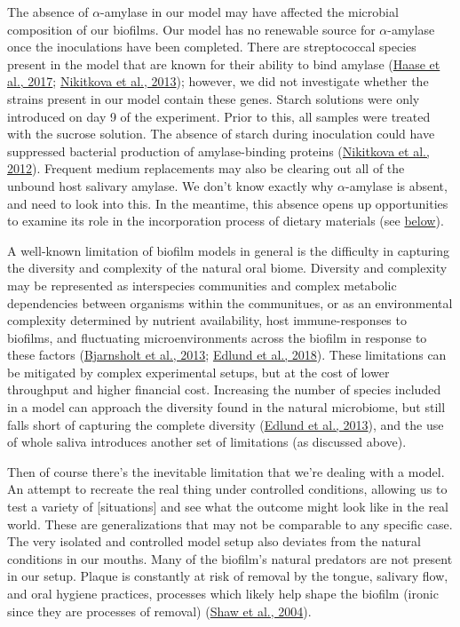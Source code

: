 \documentclass[
  letterpaper,
]{book}
\begin{document}
The absence of \(\alpha\)-amylase in our model may have affected the
microbial composition of our biofilms. Our model has no renewable source
for \(\alpha\)-amylase once the inoculations have been completed. There
are streptococcal species present in the model that are known for their
ability to bind amylase
(\protect\hyperlink{ref-haaseComparativeGenomics2017}{Haase et al.,
2017}; \protect\hyperlink{ref-nikitkovaStarchBiofilms2013}{Nikitkova et
al., 2013}); however, we did not investigate whether the strains present
in our model contain these genes. Starch solutions were only introduced
on day 9 of the experiment. Prior to this, all samples were treated with
the sucrose solution. The absence of starch during inoculation could
have suppressed bacterial production of amylase-binding proteins
(\protect\hyperlink{ref-nikitkovaEffectStarch2012}{Nikitkova et al.,
2012}). Frequent medium replacements may also be clearing out all of the
unbound host salivary amylase. We don't know exactly why
\(\alpha\)-amylase is absent, and need to look into this. In the
meantime, this absence opens up opportunities to examine its role in the
incorporation process of dietary materials (see
\protect\hyperlink{bfmodels-in-arch}{below}).

A well-known limitation of biofilm models in general is the difficulty
in capturing the diversity and complexity of the natural oral biome.
Diversity and complexity may be represented as interspecies communities
and complex metabolic dependencies between organisms within the
communitues, or as an environmental complexity determined by nutrient
availability, host immune-responses to biofilms, and fluctuating
microenvironments across the biofilm in response to these factors
(\protect\hyperlink{ref-bjarnsholtVivoBiofilm2013}{Bjarnsholt et al.,
2013}; \protect\hyperlink{ref-edlundUncoveringComplex2018}{Edlund et
al., 2018}). These limitations can be mitigated by complex experimental
setups, but at the cost of lower throughput and higher financial cost.
Increasing the number of species included in a model can approach the
diversity found in the natural microbiome, but still falls short of
capturing the complete diversity
(\protect\hyperlink{ref-edlundBiofilmModel2013}{Edlund et al., 2013}),
and the use of whole saliva introduces another set of limitations (as
discussed above).

Then of course there's the inevitable limitation that we're dealing with
a model. An attempt to recreate the real thing under controlled
conditions, allowing us to test a variety of {[}situations{]} and see
what the outcome might look like in the real world. These are
generalizations that may not be comparable to any specific case. The
very isolated and controlled model setup also deviates from the natural
conditions in our mouths. Many of the biofilm's natural predators are
not present in our setup. Plaque is constantly at risk of removal by the
tongue, salivary flow, and oral hygiene practices, processes which
likely help shape the biofilm (ironic since they are processes of
removal) (\protect\hyperlink{ref-shawCommonalityElastic2004}{Shaw et
al., 2004}).
\end{document}
